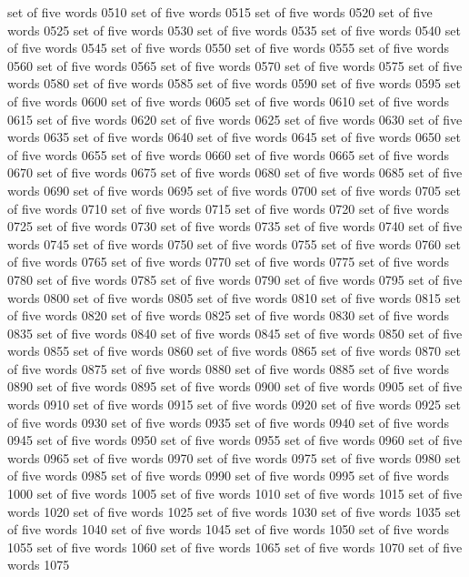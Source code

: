set	of	five	words	0510
set	of	five	words	0515
set	of	five	words	0520
set	of	five	words	0525
set	of	five	words	0530
set	of	five	words	0535
set	of	five	words	0540
set	of	five	words	0545
set	of	five	words	0550
set	of	five	words	0555
set	of	five	words	0560
set	of	five	words	0565
set	of	five	words	0570
set	of	five	words	0575
set	of	five	words	0580
set	of	five	words	0585
set	of	five	words	0590
set	of	five	words	0595
set	of	five	words	0600
set	of	five	words	0605
set	of	five	words	0610
set	of	five	words	0615
set	of	five	words	0620
set	of	five	words	0625
set	of	five	words	0630
set	of	five	words	0635
set	of	five	words	0640
set	of	five	words	0645
set	of	five	words	0650
set	of	five	words	0655
set	of	five	words	0660
set	of	five	words	0665
set	of	five	words	0670
set	of	five	words	0675
set	of	five	words	0680
set	of	five	words	0685
set	of	five	words	0690
set	of	five	words	0695
set	of	five	words	0700
set	of	five	words	0705
set	of	five	words	0710
set	of	five	words	0715
set	of	five	words	0720
set	of	five	words	0725
set	of	five	words	0730
set	of	five	words	0735
set	of	five	words	0740
set	of	five	words	0745
set	of	five	words	0750
set	of	five	words	0755
set	of	five	words	0760
set	of	five	words	0765
set	of	five	words	0770
set	of	five	words	0775
set	of	five	words	0780
set	of	five	words	0785
set	of	five	words	0790
set	of	five	words	0795
set	of	five	words	0800
set	of	five	words	0805
set	of	five	words	0810
set	of	five	words	0815
set	of	five	words	0820
set	of	five	words	0825
set	of	five	words	0830
set	of	five	words	0835
set	of	five	words	0840
set	of	five	words	0845
set	of	five	words	0850
set	of	five	words	0855
set	of	five	words	0860
set	of	five	words	0865
set	of	five	words	0870
set	of	five	words	0875
set	of	five	words	0880
set	of	five	words	0885
set	of	five	words	0890
set	of	five	words	0895
set	of	five	words	0900
set	of	five	words	0905
set	of	five	words	0910
set	of	five	words	0915
set	of	five	words	0920
set	of	five	words	0925
set	of	five	words	0930
set	of	five	words	0935
set	of	five	words	0940
set	of	five	words	0945
set	of	five	words	0950
set	of	five	words	0955
set	of	five	words	0960
set	of	five	words	0965
set	of	five	words	0970
set	of	five	words	0975
set	of	five	words	0980
set	of	five	words	0985
set	of	five	words	0990
set	of	five	words	0995
set	of	five	words	1000
set	of	five	words	1005
set	of	five	words	1010
set	of	five	words	1015
set	of	five	words	1020
set	of	five	words	1025
set	of	five	words	1030
set	of	five	words	1035
set	of	five	words	1040
set	of	five	words	1045
set	of	five	words	1050
set	of	five	words	1055
set	of	five	words	1060
set	of	five	words	1065
set	of	five	words	1070
set	of	five	words	1075
